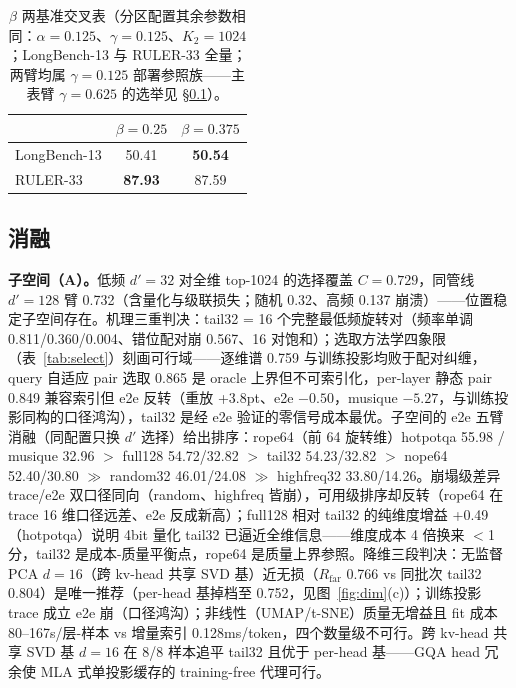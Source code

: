 \documentclass[11pt]{article}
\begin{document}
\begin{table}[h]\centering
\caption{$\beta$ 两基准交叉表（分区配置其余参数相同：$\alpha{=}0.125$、$\gamma{=}0.125$、$K_2{=}1024$；LongBench-13 与 RULER-33 全量；两臂均属 $\gamma{=}0.125$ 部署参照族——主表臂 $\gamma{=}0.625$ 的选举见 \S\ref{sec:abl}）。}
\label{tab:betacross}
\begin{tabular}{lcc}
\toprule
 & $\beta{=}0.25$ & $\beta{=}0.375$ \\
\midrule
LongBench-13 & 50.41 & \textbf{50.54} \\
RULER-33 & \textbf{87.93} & 87.59 \\
\bottomrule
\end{tabular}
\end{table}

\subsection{消融}\label{sec:abl}

\textbf{子空间（A）。}低频 $d'{=}32$ 对全维 top-1024 的选择覆盖 $C{=}0.729$，同管线 $d'{=}128$ 臂 0.732（含量化与级联损失；随机 0.32、高频 0.137 崩溃）——位置稳定子空间存在。机理三重判决：tail32 = 16 个完整最低频旋转对（频率单调 0.811/0.360/0.004、错位配对崩 0.567、16 对饱和）；选取方法学四象限（表~\ref{tab:select}）刻画可行域——逐维谱 0.759 与训练投影均败于配对纠缠，query 自适应 pair 选取 0.865 是 oracle 上界但不可索引化，per-layer 静态 pair 0.849 兼容索引但 e2e 反转（重放 +3.8pt、e2e $-0.50$，musique $-5.27$，与训练投影同构的口径鸿沟），tail32 是经 e2e 验证的零信号成本最优。子空间的 e2e 五臂消融（同配置只换 $d'$ 选择）给出排序：rope64（前 64 旋转维）hotpotqa 55.98 / musique 32.96 $>$ full128 54.72/32.82 $>$ tail32 54.23/32.82 $>$ nope64 52.40/30.80 $\gg$ random32 46.01/24.08 $\gg$ highfreq32 33.80/14.26。崩塌级差异 trace/e2e 双口径同向（random、highfreq 皆崩），可用级排序却反转（rope64 在 trace 16 维口径远差、e2e 反成新高）；full128 相对 tail32 的纯维度增益 +0.49（hotpotqa）说明 4bit 量化 tail32 已逼近全维信息——维度成本 4 倍换来 $<$1 分，tail32 是成本-质量平衡点，rope64 是质量上界参照。降维三段判决：无监督 PCA $d{=}16$（跨 kv-head 共享 SVD 基）近无损（$R_{\mathrm{far}}$ 0.766 vs 同批次 tail32 0.804）是唯一推荐（per-head 基掉档至 0.752，见图~\ref{fig:dim}(c)）；训练投影 trace 成立 e2e 崩（口径鸿沟）；非线性（UMAP/t-SNE）质量无增益且 fit 成本 80--167s/层-样本 vs 增量索引 0.128ms/token，四个数量级不可行。跨 kv-head 共享 SVD 基 $d{=}16$ 在 8/8 样本追平 tail32 且优于 per-head 基——GQA head 冗余使 MLA 式单投影缓存的 training-free 代理可行。
\end{document}
